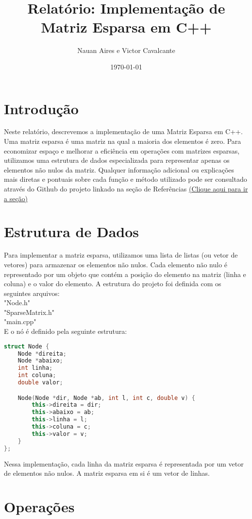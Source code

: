 \documentclass[a4paper,12pt]{article}
\title{Relatório: Implementação de Matriz Esparsa em C++}
\author{Nauan Aires e Victor Cavalcante}
\date{\today}
\begin{document}
\maketitle

\section{Introdução}

Neste relatório, descrevemos a implementação de uma Matriz Esparsa em C++. Uma matriz esparsa é uma matriz na qual a maioria dos elementos é zero. Para economizar espaço e melhorar a eficiência em operações com matrizes esparsas, utilizamos uma estrutura de dados especializada para representar apenas os elementos não nulos da matriz.
Qualquer informação adicional ou explicações mais diretas e pontuais sobre cada função e método utilizado pode ser consultado através do Github do projeto linkado na seção de Referências \hyperref[sec:ref]{(Clique aqui para ir a seção)} 

\section{Estrutura de Dados}

Para implementar a matriz esparsa, utilizamos uma lista de listas (ou vetor de vetores) para armazenar os elementos não nulos. Cada elemento não nulo é representado por um objeto que contém a posição do elemento na matriz (linha e coluna) e o valor do elemento. A estrutura do projeto foi definida com os seguintes arquivos:
\\"Node.h"
\\"SparseMatrix.h"
\\"main.cpp"
\\E o nó é definido pela seguinte estrutura:
\begin{lstlisting}[language=C++]
struct Node {
    Node *direita;
    Node *abaixo;
    int linha;
    int coluna;
    double valor;

    Node(Node *dir, Node *ab, int l, int c, double v) {
        this->direita = dir;
        this->abaixo = ab;
        this->linha = l;
        this->coluna = c;
        this->valor = v;
    }
};
\end{lstlisting}

Nessa implementação, cada linha da matriz esparsa é representada por um vetor de elementos não nulos. A matriz esparsa em si é um vetor de linhas.

\section{Operações}
\end{document}
